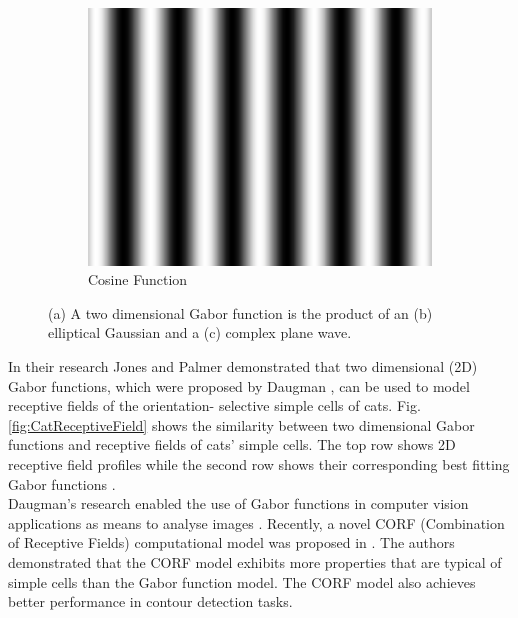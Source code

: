 \begin{figure}[h]
        \begin{subfigure}[b]{0.3\textwidth}
                \centering
                \includegraphics[width=1.0\textwidth]{figures/LitreatureReview/CosineFunction2D.png}
                \caption{Cosine Function}
                \label{fig:gaus}
        \end{subfigure}
        \caption[Example of a 2D Gabor Function]{(a) A two dimensional Gabor function is the product of an (b) elliptical Gaussian and a (c) complex plane wave.}
        \label{fig:2DGabor}
\end{figure}

In their research Jones and Palmer \cite{JonesPalmer1987} demonstrated that two dimensional (2D) Gabor functions, which were proposed by Daugman \cite{Daugman1985}, can be used to model receptive fields of the orientation- selective simple cells of cats. Fig. \ref{fig:CatReceptiveField} shows the similarity between two dimensional Gabor functions and receptive fields of cats’ simple cells. The top row shows 2D receptive field profiles while the second row shows their corresponding best fitting Gabor functions \cite{Daugman1988}. \\


Daugman’s research \cite{Daugman1985} enabled the use of Gabor functions in computer vision applications as means to analyse images \cite{Daugman1988}. Recently, a novel CORF (Combination of Receptive Fields) computational model was proposed in \cite{CORF_2012}. The authors demonstrated that the CORF model exhibits more properties that are typical of simple cells than the Gabor function model. The CORF model also achieves better performance in contour detection tasks.


